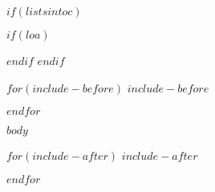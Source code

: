 \documentclass[
$if(draft)$
  draft,
$endif$
$if(fontsize)$
  $fontsize$,
$endif$
$if(margins)$
  $margins$,
$endif$
$if(spacing)$
  $spacing$,
$endif$
$if(clearpagestyle)$
  $clearpagestyle$,
$endif$
$if(notespacing)$
  $notespacing$,
$endif$
$for(classoption)$
  $classoption$$sep$,
$endfor$
]{$ut-class$}
\newcommand\listofappendices{\listofatoc}
\begin{document}
\begin{preliminary}
\tableofcontents


$if(listsintoc)$
  \listoftables

  \listoffigures

  $if(loa)$
    \listofappendices
  $endif$
$endif$

\end{preliminary}


$for(include-before)$
$include-before$

$endfor$

$body$

$for(include-after)$
$include-after$

$endfor$
\end{document}

